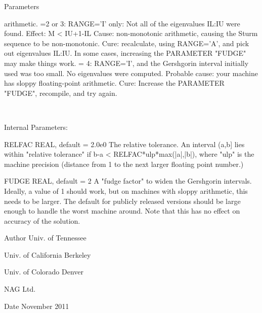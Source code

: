 \begin{DoxyParams}[1]{Parameters}
\begin{DoxyVerb}
                        arithmetic.
                =2 or 3: RANGE='I' only: Not all of the eigenvalues
                        IL:IU were found.
                        Effect: M < IU+1-IL
                        Cause:  non-monotonic arithmetic, causing the
                                Sturm sequence to be non-monotonic.
                        Cure:   recalculate, using RANGE='A', and pick
                                out eigenvalues IL:IU.  In some cases,
                                increasing the PARAMETER "FUDGE" may
                                make things work.
                = 4:    RANGE='I', and the Gershgorin interval
                        initially used was too small.  No eigenvalues
                        were computed.
                        Probable cause: your machine has sloppy
                                        floating-point arithmetic.
                        Cure: Increase the PARAMETER "FUDGE",
                              recompile, and try again.\end{DoxyVerb}
 \\
\hline
\end{DoxyParams}
\begin{DoxyParagraph}{Internal Parameters\+: }
\begin{DoxyVerb}  RELFAC  REAL, default = 2.0e0
          The relative tolerance.  An interval (a,b] lies within
          "relative tolerance" if  b-a < RELFAC*ulp*max(|a|,|b|),
          where "ulp" is the machine precision (distance from 1 to
          the next larger floating point number.)

  FUDGE   REAL, default = 2
          A "fudge factor" to widen the Gershgorin intervals.  Ideally,
          a value of 1 should work, but on machines with sloppy
          arithmetic, this needs to be larger.  The default for
          publicly released versions should be large enough to handle
          the worst machine around.  Note that this has no effect
          on accuracy of the solution.\end{DoxyVerb}
 
\end{DoxyParagraph}
\begin{DoxyAuthor}{Author}
Univ. of Tennessee 

Univ. of California Berkeley 

Univ. of Colorado Denver 

N\+A\+G Ltd. 
\end{DoxyAuthor}
\begin{DoxyDate}{Date}
November 2011 
\end{DoxyDate}
